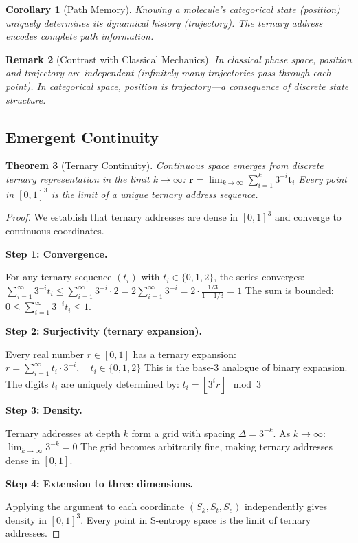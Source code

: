 \documentclass[twocolumn,10pt]{article}
\newtheorem{theorem}{Theorem}[section]
\newtheorem{corollary}[theorem]{Corollary}
\newtheorem{remark}[theorem]{Remark}
\begin{document}
\begin{corollary}[Path Memory]
\label{cor:path}
Knowing a molecule's categorical state (position) uniquely determines its dynamical history (trajectory). The ternary address encodes complete path information.
\end{corollary}

\begin{remark}[Contrast with Classical Mechanics]
In classical phase space, position and trajectory are independent (infinitely many trajectories pass through each point). In categorical space, position \emph{is} trajectory—a consequence of discrete state structure.
\end{remark}

\subsection{Emergent Continuity}

\begin{theorem}[Ternary Continuity]
\label{thm:continuity}
Continuous space emerges from discrete ternary representation in the limit $k \to \infty$:
$
\mathbf{r} = \lim_{k \to \infty} \sum_{i=1}^{k} 3^{-i} \mathbf{t}_i
$
Every point in $[0,1]^3$ is the limit of a unique ternary address sequence.
\end{theorem}

\begin{proof}
We establish that ternary addresses are dense in $[0,1]^3$ and converge to continuous coordinates.

\textbf{Step 1: Convergence.}

For any ternary sequence $(t_i)$ with $t_i \in \{0, 1, 2\}$, the series converges:
$
\sum_{i=1}^{\infty} 3^{-i} t_i \leq \sum_{i=1}^{\infty} 3^{-i} \cdot 2 = 2 \sum_{i=1}^{\infty} 3^{-i} = 2 \cdot \frac{1/3}{1-1/3} = 1
$
The sum is bounded: $0 \leq \sum_{i=1}^{\infty} 3^{-i} t_i \leq 1$.

\textbf{Step 2: Surjectivity (ternary expansion).}

Every real number $r \in [0,1]$ has a ternary expansion:
$
r = \sum_{i=1}^{\infty} t_i \cdot 3^{-i}, \quad t_i \in \{0, 1, 2\}
$
This is the base-3 analogue of binary expansion. The digits $t_i$ are uniquely determined by:
$
t_i = \left\lfloor 3^i r \right\rfloor \mod 3
$

\textbf{Step 3: Density.}

Ternary addresses at depth $k$ form a grid with spacing $\Delta = 3^{-k}$. As $k \to \infty$:
$
\lim_{k \to \infty} 3^{-k} = 0
$
The grid becomes arbitrarily fine, making ternary addresses dense in $[0,1]$.

\textbf{Step 4: Extension to three dimensions.}

Applying the argument to each coordinate $(S_k, S_t, S_e)$ independently gives density in $[0,1]^3$. Every point in S-entropy space is the limit of ternary addresses.
\end{proof}
\end{document}
